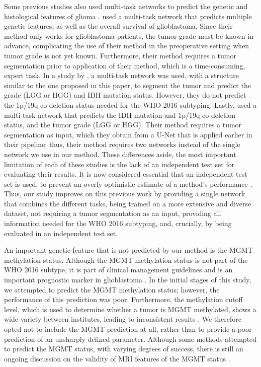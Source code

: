 Some previous studies also used multi-task networks to predict the genetic and histological features of glioma \autocite{tang2020multi, xue2020radiomicsmulti, decuyper2020automated}.
 used a multi-task network that predicts multiple genetic features, as well as the overall survival of glioblastoma.
Since their method only works for glioblastoma patients, the \gls{tumor} grade must be known in advance, complicating the use of their method in the preoperative setting when \gls{tumor} grade is not yet known.
Furthermore, their method requires a \gls{tumor} segmentation prior to application of their method, which is a time-consuming, expert task.
In a study by , a multi-task network was used, with a structure similar to the one proposed in this paper, to segment the \gls{tumor} and predict the grade (\gls{LGG} or \gls{HGG}) and \gls{IDH} mutation status.
However, they do not predict the 1p/19q co-deletion status needed for the \gls{WHO} 2016 subtyping.
Lastly,  used a multi-task network that predicts the \gls{IDH} mutation and 1p/19q co-deletion status, and the \gls{tumor} grade (\gls{LGG} or \gls{HGG}).
Their method requires a \gls{tumor} segmentation as input, which they obtain from a U-Net that is applied earlier in their pipeline; thus, their method requires two networks instead of the single network we use in our method.
These differences aside, the most important limitation of each of these studies is the lack of an independent test set for evaluating their results.
It is now considered essential that an independent test set is used, to prevent an overly optimistic estimate of a method's performance \autocite{gillies2016radiomics, rizzo2018radiomics, lohmann2020radiomics, yip2016applicationsradiomics}.
Thus, our study improves on this previous work by providing a single network that combines the different tasks, being trained on a more extensive and diverse dataset, not requiring a \gls{tumor} segmentation as an input, providing all information needed for the \gls{WHO} 2016 subtyping, and, crucially, by being evaluated in an independent test set.

An important genetic feature that is not predicted by our method is the \gls{MGMT} methylation status.
Although the \gls{MGMT} methylation status is not part of the \gls{WHO} 2016 subtype, it is part of clinical management guidelines and is an important prognostic marker in glioblastoma \autocite{louis20162016}.
In the initial stages of this study, we attempted to predict the \gls{MGMT} methylation status; however, the performance of this prediction was poor.
Furthermore, the methylation cutoff level, which is used to determine whether a \gls{tumor} is \gls{MGMT} methylated, shows a wide variety between institutes, leading to inconsistent results  \autocite{malstrom2019MGMT}.
We therefore opted not to include the \gls{MGMT} prediction at all, rather than to provide a poor prediction of an unsharply defined parameter.
Although some methods attempted to predict the \gls{MGMT} status, with varying degrees of success, there is still an ongoing discussion on the validity of \gls{MRI} features of the \gls{MGMT} status \autocite{tang2020multi, sasaki2019mgmt, gupta2013dwimgmt, carrillo2012mgmt, mikkelsen2020MGMT}.

